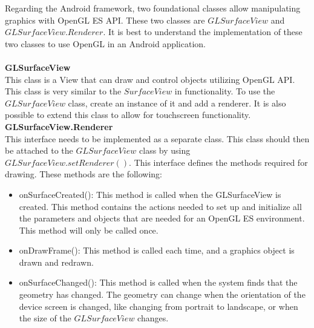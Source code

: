 Regarding the Android framework, two foundational classes allow manipulating graphics with OpenGL ES API. These two classes are $GLSurfaceView$ and $GLSurfaceView.Renderer$. It is best to understand the implementation of these two classes to use OpenGL in an Android application.\cite{androiddevelopers2022}\\
\\
\textbf{GLSurfaceView}\\
This class is a View that can draw and control objects utilizing OpenGL API. This class is very similar to the $SurfaceView$ in functionality. To use the $GLSurfaceView$ class, create an instance of it and add a renderer. It is also possible to extend this class to allow for touchscreen functionality.
\\
\textbf{GLSurfaceView.Renderer}\\
This interface needs to be implemented as a separate class. This class should then be attached to the $GLSurfaceView$ class by using $GLSurfaceView.setRenderer()$. This interface defines the methods required for drawing. These methods are the following:
\begin{itemize}
    \item onSurfaceCreated(): This method is called when the GLSurfaceView is created. This method contains the actions needed to set up and initialize all the parameters and objects that are needed for an OpenGL ES environment. This method will only be called once.
    \item onDrawFrame(): This method is called each time, and a graphics object is drawn and redrawn. 
    \item onSurfaceChanged(): This method is called when the system finds that the geometry has changed. The geometry can change when the orientation of the device screen is changed, like changing from portrait to landscape, or when the size of the $GLSurfaceView$ changes.
\end{itemize}